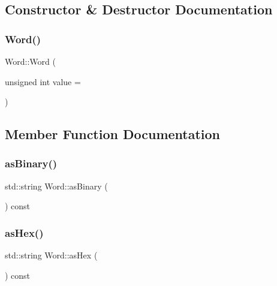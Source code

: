 \subsection{Constructor \& Destructor Documentation}
\mbox{\label{class_word_a0576a5f8e54cdd41d7043adc310e2223}} 
\subsubsection{\texorpdfstring{Word()}{Word()}}
{\footnotesize\ttfamily Word\+::\+Word (\begin{DoxyParamCaption}\item[{unsigned int}]{value = {} }\end{DoxyParamCaption})}



\subsection{Member Function Documentation}
\mbox{\label{class_word_ae8c5ed46c111c702ce9c9814fe870373}} 
\subsubsection{\texorpdfstring{as\+Binary()}{asBinary()}}
{\footnotesize\ttfamily std\+::string Word\+::as\+Binary (\begin{DoxyParamCaption}{ }\end{DoxyParamCaption}) const}

\mbox{\label{class_word_a03edc78c8f1856c0b2765ae792dd3448}} 
\subsubsection{\texorpdfstring{as\+Hex()}{asHex()}}
{\footnotesize\ttfamily std\+::string Word\+::as\+Hex (\begin{DoxyParamCaption}{ }\end{DoxyParamCaption}) const}

\mbox{\label{class_word_a1293142a4a807e4c08cbf8468b9cfb37}} 
